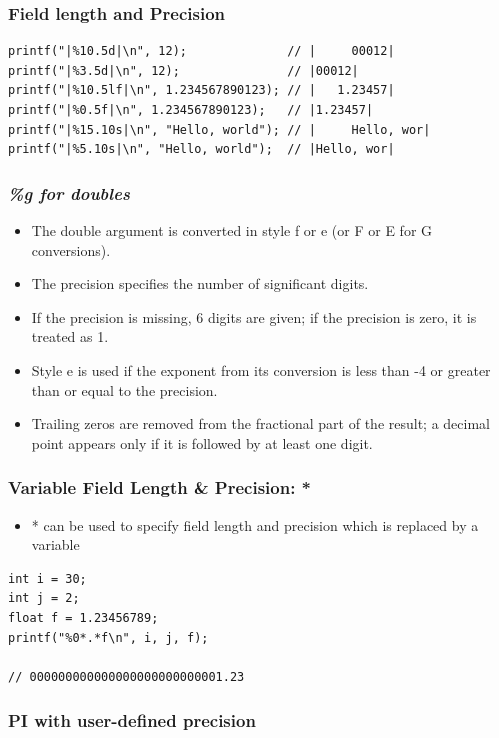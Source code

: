 \documentclass{../c-lecture}
\begin{document}
\begin{frame}[fragile]
  \frametitle{Field length and Precision}
  \begin{verbatim}
printf("|%10.5d|\n", 12);              // |     00012|
printf("|%3.5d|\n", 12);               // |00012|
printf("|%10.5lf|\n", 1.234567890123); // |   1.23457|
printf("|%0.5f|\n", 1.234567890123);   // |1.23457|
printf("|%15.10s|\n", "Hello, world"); // |     Hello, wor|
printf("|%5.10s|\n", "Hello, world");  // |Hello, wor|
  \end{verbatim}
\end{frame}

\begin{frame}
  \frametitle{\textit{\%g for doubles}}
  \begin{itemize}
    \item The double argument is converted in style f or e (or F or E for G conversions).
    \item The precision specifies the number of significant digits.
    \item If the precision is missing, 6 digits are given; if the precision is zero, it is treated as 1.
    \item Style e is used if the exponent from its conversion is less than -4 or greater than or equal to the precision.
    \item Trailing zeros are removed from the fractional part of the result; a decimal point appears only if it is followed by at least one digit.
  \end{itemize}
\end{frame}

\begin{frame}[fragile]
  \frametitle{Variable Field Length \& Precision: *}
  \begin{itemize}
    \item
      * can be used to specify field length and precision which is replaced by a
      variable
  \end{itemize}
  \begin{verbatim}
int i = 30;
int j = 2;
float f = 1.23456789;
printf("%0*.*f\n", i, j, f);

// 000000000000000000000000001.23
  \end{verbatim}
\end{frame}

\begin{frame}[fragile]
  \frametitle{PI with user-defined precision}
  \inputminted[bgcolor=Black]{c}{./src/pi.c}
\end{frame}
\end{document}
